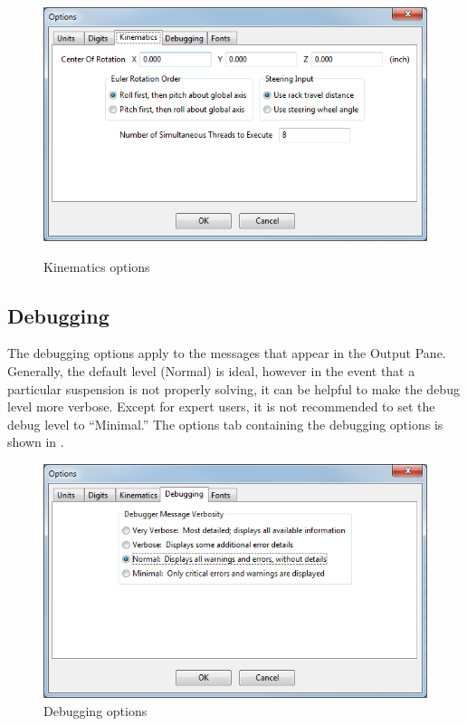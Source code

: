 \begin{figure}
\includegraphics[width=\textwidth]{images/optionsKinematics} \label{fig:optionsKinematics}
\caption{Kinematics options}
\centering
\end{figure}

\subsection{Debugging} \label{ssec:optionsDebugging}

The debugging options apply to the messages that appear in the Output Pane.  Generally, the default level (Normal) is ideal, however in the event that a particular suspension is not properly solving, it can be helpful to make the debug level more verbose.  Except for expert users, it is not recommended to set the debug level to ``Minimal.''  The options tab containing the debugging options is shown in .

\begin{figure}
\includegraphics[width=\textwidth]{images/optionsDebugging}
\caption{Debugging options} \label{fig:optionsDebugging}
\centering
\end{figure}

